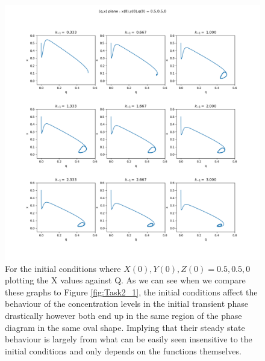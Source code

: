 \documentclass[11pt,a4paper]{CLabBookTemplate} %
\begin{document}
\begin{figure}[h!]
	\centering
	\includegraphics[width = 160mm]{Figures/Task2_3.png}
	\caption{For the initial conditions where $X(0),Y(0),Z(0) = 0.5,0.5,0$ plotting the X values against Q. As we can see when we compare these graphs to Figure \ref{fig:Task2_1}, the initial conditions affect the behaviour of the concentration levels in the initial transient phase drastically however both end up in the same region of the phase diagram in the same oval shape. Implying that their steady state behaviour is largely from what can be easily seen insensitive to the initial conditions and only depends on the functions themselves.   }
	\label{fig:Task2_3}
\end{figure}
\end{document}
